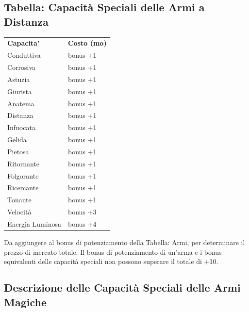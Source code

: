 \documentclass[a4paper,11pt,twoside,openany]{book}
\begin{document}
\subsection{Tabella: Capacità Speciali delle Armi a Distanza}

\label{tabella-capacita-speciali-delle-armi-a-distanza}

\begin{tabular}{ll}
	\toprule
	\textbf{Capacita'}       & \textbf{Costo (mo)}\\
	Conduttiva \index{Conduttiva}            & bonus +1\\
	Corrosiva\index{Corrosiva}               & bonus +1\\
	Astuzia \index{Astuzia}  & bonus +1\\
	Giurista\index{Giurista} & bonus +1\\
	Anatema \index{Anatema}  & bonus +1\\
	Distanza\index{Distanza} & bonus +1\\
	Infuocata\index{Infuocata}               & bonus +1\\
	Gelida \index{Gelida}    & bonus +1\\
	Pietosa \index{Pietosa}  & bonus +1\\
	Ritornante \index{Ritornante}            & bonus +1\\
	Folgorante\index{Folgorante}             & bonus +1\\
	Ricercante \index{Ricercante}            & bonus +1\\
	Tonante \index{Tonante}  & bonus +1\\
	Velocità \index{Velocita'}               & bonus +3\\
	Energia Luminosa\index{Energia Luminosa} & bonus +4\\
\end{tabular}

\bigskip

Da aggiungere al bonus di potenziamento della Tabella: Armi, per determinare
il prezzo di mercato totale. Il bonus di potenziamento di un'arma
e i bonus equivalenti delle capacità speciali non possono superare
il totale di +10.

\subsection{Descrizione delle Capacità Speciali delle Armi Magiche}

\label{descrizione-delle-capacita-speciali-delle-armi-magiche}
\end{document}
